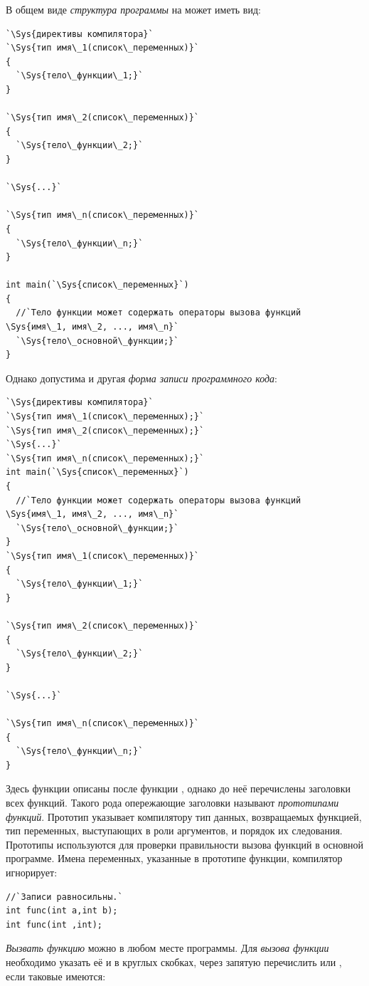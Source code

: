 В общем виде \emph{структура программы} на  может иметь вид:
\begin{lstlisting}
`\Sys{директивы компилятора}`
`\Sys{тип имя\_1(список\_переменных)}`
{
  `\Sys{тело\_функции\_1;}`
}

`\Sys{тип имя\_2(список\_переменных)}`
{
  `\Sys{тело\_функции\_2;}`
}

`\Sys{...}`

`\Sys{тип имя\_n(список\_переменных)}`
{
  `\Sys{тело\_функции\_n;}`
}

int main(`\Sys{список\_переменных}`)
{
  //`Тело функции может содержать операторы вызова функций \Sys{имя\_1, имя\_2, ..., имя\_n}`
  `\Sys{тело\_основной\_функции;}`
}
\end{lstlisting}
Однако допустима и другая \emph{форма записи программного кода}:

\begin{lstlisting}
`\Sys{директивы компилятора}`
`\Sys{тип имя\_1(список\_переменных);}`
`\Sys{тип имя\_2(список\_переменных);}`
`\Sys{...}`
`\Sys{тип имя\_n(список\_переменных);}`
int main(`\Sys{список\_переменных}`)
{
  //`Тело функции может содержать операторы вызова функций \Sys{имя\_1, имя\_2, ..., имя\_n}`
  `\Sys{тело\_основной\_функции;}`
}
`\Sys{тип имя\_1(список\_переменных)}`
{
  `\Sys{тело\_функции\_1;}`
}

`\Sys{тип имя\_2(список\_переменных)}`
{
  `\Sys{тело\_функции\_2;}`
}

`\Sys{...}`

`\Sys{тип имя\_n(список\_переменных)}`
{
  `\Sys{тело\_функции\_n;}`
}
\end{lstlisting}

Здесь функции описаны после функции , однако до неё перечислены заголовки всех функций. Такого
рода опережающие заголовки называют \emph{прототипами
функций}. Прототип указывает компилятору тип данных, возвращаемых функцией, тип переменных,
выступающих в роли аргументов, и порядок их следования. Прототипы используются для проверки правильности вызова функций
в основной программе. Имена переменных, указанные в прототипе функции, компилятор игнорирует:
\begin{lstlisting}
//`Записи равносильны.`
int func(int a,int b);
int func(int ,int);
\end{lstlisting}

\emph{Вызвать функцию} можно в любом месте программы. Для \emph{вызова
функции} необходимо указать её  и в круглых скобках, через запятую перечислить
 или , если таковые имеются:

